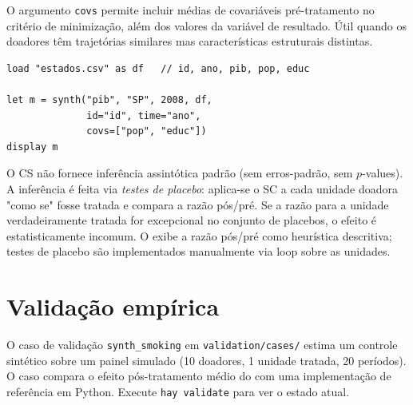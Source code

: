 O argumento \texttt{covs} permite incluir médias de covariáveis pré-tratamento
no critério de minimização, além dos valores da variável de resultado. Útil
quando os doadores têm trajetórias similares mas características estruturais
distintas.

\begin{lstlisting}[caption={Fluxo típico — avaliação de política estadual}]
load "estados.csv" as df   // id, ano, pib, pop, educ

let m = synth("pib", "SP", 2008, df,
              id="id", time="ano",
              covs=["pop", "educ"])
display m
\end{lstlisting}

\begin{nota}
  O CS não fornece inferência assintótica padrão (sem erros-padrão, sem
  $p$-values). A inferência é feita via \emph{testes de placebo}: aplica-se
  o SC a cada unidade doadora "como se" fosse tratada e compara a razão
  pós/pré. Se a razão para a unidade verdadeiramente tratada for excepcional
  no conjunto de placebos, o efeito é estatisticamente incomum.
  O \hayashi{} exibe a razão pós/pré como heurística descritiva; testes de
  placebo são implementados manualmente via loop sobre as unidades.
\end{nota}

\section{Validação empírica}

O caso de validação \texttt{synth\_smoking} em \texttt{validation/cases/}
estima um controle sintético sobre um painel simulado (10 doadores, 1 unidade
 tratada, 20 períodos). O caso compara o efeito pós-tratamento médio do
\hayashi{} com uma implementação de referência em Python. Execute
\lstinline{hay validate} para ver o estado atual.
